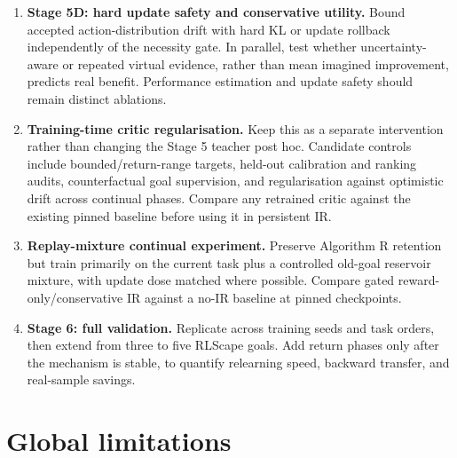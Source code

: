 \documentclass[10pt]{article}
\begin{document}
\begin{enumerate}
  \item \textbf{Stage 5D: hard update safety and conservative utility.} Bound accepted action-distribution drift with hard KL or update rollback independently of the necessity gate. In parallel, test whether uncertainty-aware or repeated virtual evidence, rather than mean imagined improvement, predicts real benefit. Performance estimation and update safety should remain distinct ablations.
  \item \textbf{Training-time critic regularisation.} Keep this as a separate intervention rather than changing the Stage 5 teacher post hoc. Candidate controls include bounded/return-range targets, held-out calibration and ranking audits, counterfactual goal supervision, and regularisation against optimistic drift across continual phases. Compare any retrained critic against the existing pinned baseline before using it in persistent IR.
  \item \textbf{Replay-mixture continual experiment.} Preserve Algorithm R retention but train primarily on the current task plus a controlled old-goal reservoir mixture, with update dose matched where possible. Compare gated reward-only/conservative IR against a no-IR baseline at pinned checkpoints.
  \item \textbf{Stage 6: full validation.} Replicate across training seeds and task orders, then extend from three to five RLScape goals. Add return phases only after the mechanism is stable, to quantify relearning speed, backward transfer, and real-sample savings.
\end{enumerate}

\section{Global limitations}
\end{document}
